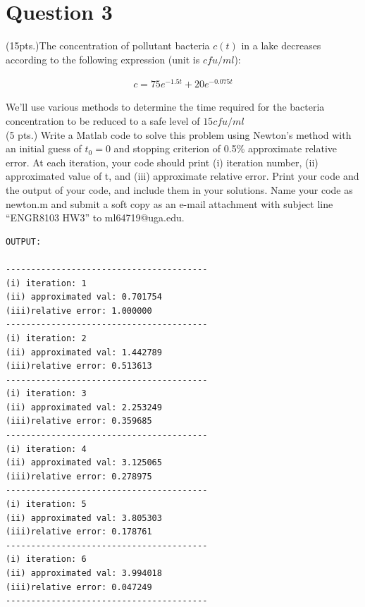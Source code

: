 \documentclass{article}
\begin{document}
\section*{Question 3} %
(15pts.)The concentration of pollutant bacteria $c(t)$ in a lake decreases according to the following expression (unit is $cfu/ml$):

\begin{gather*}
  c = 75e^{-1.5t} + 20e^{-0.075t}
\end{gather*}

\noindent
We’ll use various methods to determine the time required for the bacteria concentration to be reduced to a safe level of $15 cf u/ml$\\

\noindent
(5 pts.) Write a Matlab code to solve this problem using Newton’s method with an initial guess of $t_{0} = 0$ and stopping criterion of 0.5\% approximate relative error. At each iteration, your code should print (i) iteration number, (ii) approximated value of t, and (iii) approximate relative error. Print your code and the output of your code, and include them in your solutions. Name your code as newton.m and submit a soft copy as an e-mail attachment with subject line “ENGR8103 HW3” to ml64719@uga.edu.\\



\begin{verbatim}
OUTPUT:

----------------------------------------
(i) iteration: 1
(ii) approximated val: 0.701754
(iii)relative error: 1.000000
----------------------------------------
(i) iteration: 2
(ii) approximated val: 1.442789
(iii)relative error: 0.513613
----------------------------------------
(i) iteration: 3
(ii) approximated val: 2.253249
(iii)relative error: 0.359685
----------------------------------------
(i) iteration: 4
(ii) approximated val: 3.125065
(iii)relative error: 0.278975
----------------------------------------
(i) iteration: 5
(ii) approximated val: 3.805303
(iii)relative error: 0.178761
----------------------------------------
(i) iteration: 6
(ii) approximated val: 3.994018
(iii)relative error: 0.047249
----------------------------------------
\end{verbatim}



\end{document}
